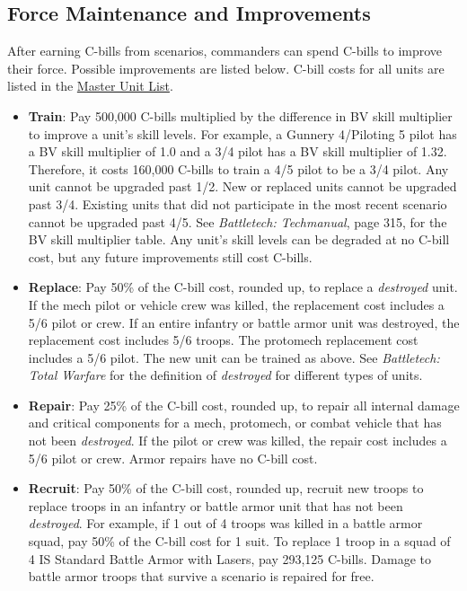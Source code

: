 \documentclass[UTF8]{article}
\begin{document}
\subsection{Force Maintenance and Improvements}

After earning C-bills from scenarios, commanders can spend C-bills to improve their force.
Possible improvements are listed below.
C-bill costs for all units are listed in the \href{http://www.masterunitlist.info/}{Master Unit List}.\\

\begin{itemize}

\item {\bf Train}: Pay 500,000 C-bills multiplied by the difference in BV skill multiplier to improve a unit's skill levels.
For example, a Gunnery 4/Piloting 5 pilot has a BV skill multiplier of 1.0 and a 3/4 pilot has a BV skill multiplier of 1.32.
Therefore, it costs 160,000 C-bills to train a 4/5 pilot to be a 3/4 pilot.
Any unit cannot be upgraded past 1/2.
New or replaced units cannot be upgraded past 3/4.
Existing units that did not participate in the most recent scenario cannot be upgraded past 4/5.
See \emph{Battletech: Techmanual}, page 315, for the BV skill multiplier table.
Any unit's skill levels can be degraded at no C-bill cost, but any future improvements still cost C-bills.

\item {\bf Replace}: Pay 50\% of the C-bill cost, rounded up, to replace a \emph{destroyed} unit.
If the mech pilot or vehicle crew was killed, the replacement cost includes a 5/6 pilot or crew.
If an entire infantry or battle armor unit was destroyed, the replacement cost includes 5/6 troops.
The protomech replacement cost includes a 5/6 pilot.
The new unit can be trained as above.
See \emph{Battletech: Total Warfare} for the definition of \emph{destroyed} for different types of units.

\item {\bf Repair}: Pay 25\% of the C-bill cost, rounded up, to repair all internal damage and critical components for a mech, protomech, or combat vehicle that has not been \emph{destroyed}.
If the pilot or crew was killed, the repair cost includes a 5/6 pilot or crew.
Armor repairs have no C-bill cost.

\item {\bf Recruit}: Pay 50\% of the C-bill cost, rounded up, recruit new troops to replace troops in an infantry or battle armor unit that has not been \emph{destroyed}.
For example, if 1 out of 4 troops was killed in a battle armor squad, pay 50\% of the C-bill cost for 1 suit.
To replace 1 troop in a squad of 4 IS Standard Battle Armor with Lasers, pay 293,125 C-bills.
Damage to battle armor troops that survive a scenario is repaired for free.


\end{itemize}
\end{document}
